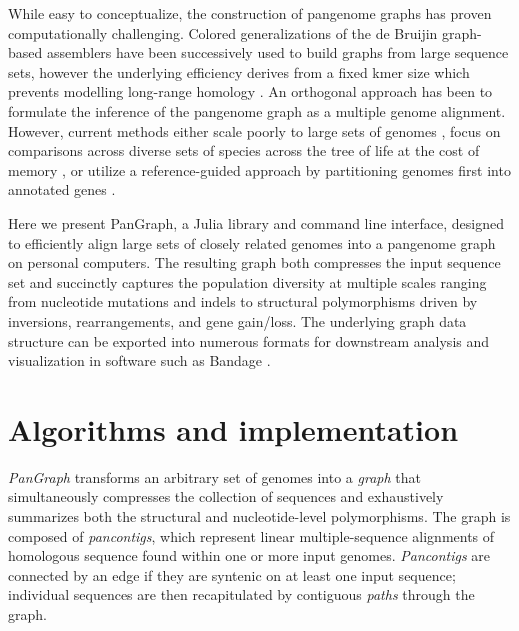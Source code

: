 \documentclass[aps,rmp,reprint,superscriptaddress,notitlepage,10pt]{revtex4-1}
\begin{document}
While easy to conceptualize, the construction of pangenome graphs has proven computationally challenging.
Colored generalizations of the de Bruijin graph-based assemblers have been successively used to build graphs from large sequence sets, however the underlying efficiency derives from a fixed kmer size which prevents modelling long-range homology \cite{iqbal2012novo,muggli2017succinct}.
An orthogonal approach has been to formulate the inference of the pangenome graph as a multiple genome alignment.
However, current methods either scale poorly to large sets of genomes \cite{darling2010progressivemauve}, focus on comparisons across diverse sets of species across the tree of life at the cost of memory \cite{armstrong2020progressive}, or utilize a reference-guided approach by partitioning genomes first into annotated genes \cite{gautreau2020ppanggolin,colquhoun2021pandora}.

Here we present PanGraph, a Julia \cite{bezanson2017julia} library and command line interface, designed to efficiently align large sets of closely related genomes into a pangenome graph on personal computers.
The resulting graph both compresses the input sequence set and succinctly captures the population diversity at multiple scales ranging from nucleotide mutations and indels to structural polymorphisms driven by inversions, rearrangements, and gene gain/loss.
The underlying graph data structure can be exported into numerous formats for downstream analysis and visualization in software such as Bandage \cite{wick2015bandage}.

\section{Algorithms and implementation}
\emph{PanGraph} transforms an arbitrary set of genomes into a \emph{graph} that simultaneously compresses the collection of sequences and exhaustively summarizes both the structural and nucleotide-level polymorphisms.
The graph is composed of \emph{pancontigs}, which represent linear multiple-sequence alignments of homologous sequence found within one or more input genomes.
\emph{Pancontigs} are connected by an edge if they are syntenic on at least one input sequence; individual sequences are then recapitulated by contiguous \emph{paths} through the graph.
\end{document}
